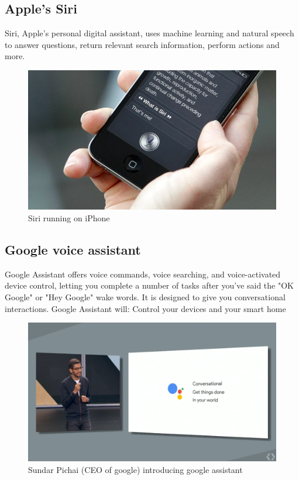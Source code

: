 \documentclass[11pt]{article}
\begin{document}
\subsection{Apple's Siri}
\label{sec:org9fabae6}
Siri, Apple's personal digital assistant, uses machine learning and natural speech
to answer questions, return relevant search information, perform actions and more.
\begin{figure}[htbp]
\centering
\includegraphics[width=.9\linewidth]{./img/siri.png}
\caption{\label{fig:orge7f73f8}Siri running on iPhone}
\end{figure}

\subsection{Google voice assistant}
\label{sec:orgb3de5cb}
Google Assistant offers voice commands, voice searching, and voice-activated
device control, letting you complete a number of tasks after you've said the
"OK Google" or "Hey Google" wake words. It is designed to give you conversational
interactions. Google Assistant will: Control your devices and your smart home
\begin{figure}[htbp]
\centering
\includegraphics[width=.9\linewidth]{./img/google-assistant.png}
\caption{\label{fig:org51f6950}Sundar Pichai (CEO of google) introducing google assistant}
\end{figure}
\end{document}
